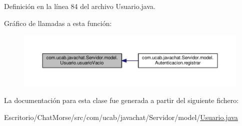 Definición en la línea 84 del archivo Usuario.\-java.



Gráfico de llamadas a esta función\-:\nopagebreak
\begin{figure}[H]
\begin{center}
\leavevmode
\includegraphics[width=350pt]{classcom_1_1ucab_1_1javachat_1_1_servidor_1_1model_1_1_usuario_ab8d31feaf359f00aba0c0ace2244a9f0_icgraph}
\end{center}
\end{figure}




La documentación para esta clase fue generada a partir del siguiente fichero\-:\begin{DoxyCompactItemize}
\item 
Escritorio/\-Chat\-Morse/src/com/ucab/javachat/\-Servidor/model/\hyperlink{_servidor_2model_2_usuario_8java}{Usuario.\-java}\end{DoxyCompactItemize}
